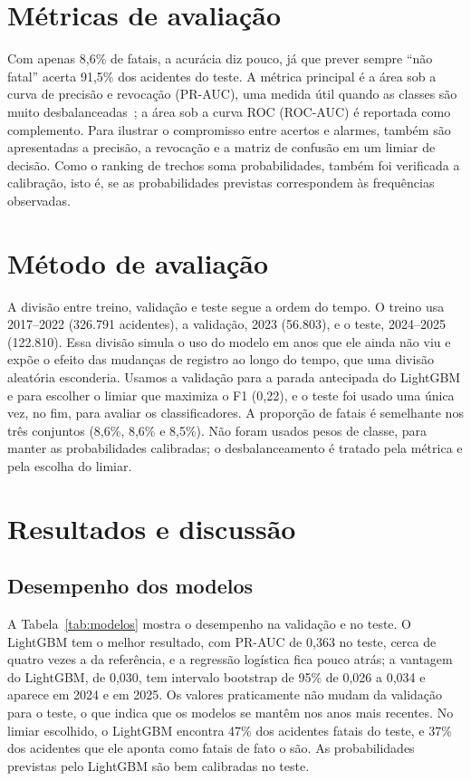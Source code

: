 \documentclass[12pt]{article}
\begin{document}
\section{Métricas de avaliação}

Com apenas 8,6\% de fatais, a acurácia diz pouco, já que prever sempre ``não fatal'' acerta 91,5\% dos acidentes do teste. A métrica principal é a área sob a curva de precisão e revocação (PR-AUC), uma medida útil quando as classes são muito desbalanceadas~\cite{sklearnpr}; a área sob a curva ROC (ROC-AUC) é reportada como complemento. Para ilustrar o compromisso entre acertos e alarmes, também são apresentadas a precisão, a revocação e a matriz de confusão em um limiar de decisão. Como o ranking de trechos soma probabilidades, também foi verificada a calibração, isto é, se as probabilidades previstas correspondem às frequências observadas.

\section{Método de avaliação}

A divisão entre treino, validação e teste segue a ordem do tempo. O treino usa 2017--2022 (326.791 acidentes), a validação, 2023 (56.803), e o teste, 2024--2025 (122.810). Essa divisão simula o uso do modelo em anos que ele ainda não viu e expõe o efeito das mudanças de registro ao longo do tempo, que uma divisão aleatória esconderia. Usamos a validação para a parada antecipada do LightGBM e para escolher o limiar que maximiza o F1 (0,22), e o teste foi usado uma única vez, no fim, para avaliar os classificadores. A proporção de fatais é semelhante nos três conjuntos (8,6\%, 8,6\% e 8,5\%). Não foram usados pesos de classe, para manter as probabilidades calibradas; o desbalanceamento é tratado pela métrica e pela escolha do limiar.

\section{Resultados e discussão}

\subsection{Desempenho dos modelos}

A Tabela~\ref{tab:modelos} mostra o desempenho na validação e no teste. O LightGBM tem o melhor resultado, com PR-AUC de 0,363 no teste, cerca de quatro vezes a da referência, e a regressão logística fica pouco atrás; a vantagem do LightGBM, de 0,030, tem intervalo bootstrap de 95\% de 0,026 a 0,034 e aparece em 2024 e em 2025. Os valores praticamente não mudam da validação para o teste, o que indica que os modelos se mantêm nos anos mais recentes. No limiar escolhido, o LightGBM encontra 47\% dos acidentes fatais do teste, e 37\% dos acidentes que ele aponta como fatais de fato o são. As probabilidades previstas pelo LightGBM são bem calibradas no teste.
\end{document}
